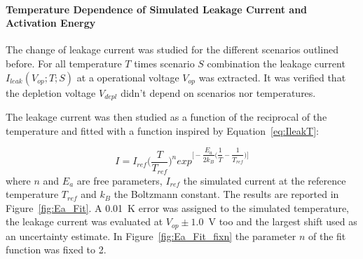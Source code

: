 \paragraph{Temperature Dependence of Simulated Leakage Current and Activation Energy}

The change of leakage current was studied for the different scenarios outlined before. 
For all temperature $T$ times scenario $S$ combination the leakage current $I_{leak}(V_{op};T;S)$ 
at a 
operational voltage 
$V_{op}$ 
was extracted. It was verified that the depletion voltage $V_{depl}$ didn't depend on scenarios nor temperatures.

 The leakage current was then studied as a function of the reciprocal of the 
temperature and fitted with a function inspired by Equation~\ref{eq:IleakT}:

\begin{equation}
I = I_{ref}\Bigg(\dfrac{T}{T_{ref}}\Bigg)^n exp^{\Bigg[ -\dfrac{E_{a}}{2k_B}\Bigg( \dfrac{1}{T}- \dfrac{1}{T_{ref}} \Bigg) \Bigg]}
\label{eq:ITfunc}
\end{equation}
where $n$ and $E_{a}$ are free parameters, $I_{ref}$ the simulated current at the reference 
temperature $T_{ref}$ and $k_B$ the Boltzmann constant.
The results are reported in Figure~\ref{fig:Ea_Fit}. A 0.01~K error was assigned to the 
simulated temperature, the leakage current was evaluated at $V_{op}\pm1.0$~V too and the largest 
shift used as an uncertainty estimate.
In Figure~\ref{fig:Ea_Fit_fixn} the  parameter $n$ of the fit function was fixed to 2.

